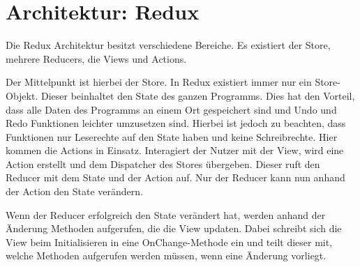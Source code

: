 \documentclass[a4paper]{scrreprt}
\begin{document}
\section{Architektur: Redux}
Die Redux Architektur besitzt verschiedene Bereiche. Es existiert der Store, mehrere Reducers, die Views und Actions.

Der Mittelpunkt ist hierbei der Store. In Redux existiert immer nur ein Store-Objekt. Dieser beinhaltet den State des ganzen Programms. Dies hat den Vorteil, dass alle Daten des Programms an einem Ort gespeichert sind und Undo und Redo Funktionen leichter umzusetzen sind. Hierbei ist jedoch zu beachten, dass Funktionen nur Leserechte auf den State haben und keine Schreibrechte.
Hier kommen die Actions in Einsatz. Interagiert der Nutzer mit der View, wird eine Action erstellt und dem Dispatcher des Stores übergeben. Dieser ruft den Reducer mit dem State und der Action auf. Nur der Reducer kann nun anhand der Action den State verändern.

Wenn der Reducer erfolgreich den State verändert hat, werden anhand der Änderung Methoden aufgerufen, die die View updaten. Dabei schreibt sich die View beim Initialisieren in eine OnChange-Methode ein und teilt dieser mit, welche Methoden aufgerufen werden müssen, wenn eine Änderung vorliegt.
\end{document}
